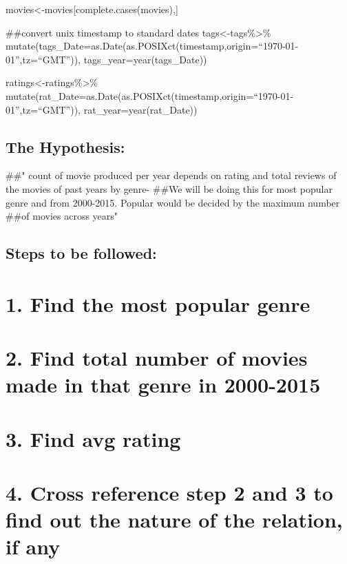 \documentclass[]{article}
\begin{document}
movies\textless{}-movies{[}complete.cases(movies),{]}

\#\#convert unix timestamp to standard dates
tags\textless{}-tags\%\textgreater{}\%
mutate(tags\_Date=as.Date(as.POSIXct(timestamp,origin=``1970-01-01'',tz=``GMT'')),
tags\_year=year(tags\_Date))

ratings\textless{}-ratings\%\textgreater{}\%
mutate(rat\_Date=as.Date(as.POSIXct(timestamp,origin=``1970-01-01'',tz=``GMT'')),
rat\_year=year(rat\_Date))

\hypertarget{the-hypothesis}{%
\subsection{The Hypothesis:}\label{the-hypothesis}}

\#\#" count of movie produced per year depends on rating and total
reviews of the movies of past years by genre- \#\#We will be doing this
for most popular genre and from 2000-2015. Popular would be decided by
the maximum number \#\#of movies across years"

\hypertarget{steps-to-be-followed}{%
\subsection{Steps to be followed:}\label{steps-to-be-followed}}

\hypertarget{find-the-most-popular-genre}{%
\section{1. Find the most popular
genre}\label{find-the-most-popular-genre}}

\hypertarget{find-total-number-of-movies-made-in-that-genre-in-2000-2015}{%
\section{2. Find total number of movies made in that genre in
2000-2015}\label{find-total-number-of-movies-made-in-that-genre-in-2000-2015}}

\hypertarget{find-avg-rating}{%
\section{3. Find avg rating}\label{find-avg-rating}}

\hypertarget{cross-reference-step-2-and-3-to-find-out-the-nature-of-the-relation-if-any}{%
\section{4. Cross reference step 2 and 3 to find out the nature of the
relation, if
any}\label{cross-reference-step-2-and-3-to-find-out-the-nature-of-the-relation-if-any}}
\end{document}
